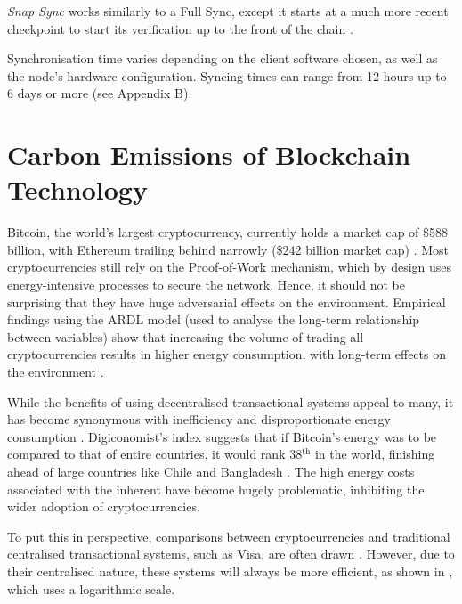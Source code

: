 \textit{Snap Sync} works similarly to a Full Sync, except it starts at a much more recent checkpoint to start its verification up to the front of the chain \cite{2022DeveloperGo-ethereum}.

Synchronisation time varies depending on the client software chosen, as well as the node's hardware configuration. Syncing times can range from 12 hours up to 6 days or more (see Appendix B).



\section{Carbon Emissions of Blockchain Technology }

Bitcoin, the world's largest cryptocurrency, currently holds a market cap of \$588 billion, with Ethereum trailing behind narrowly (\$242 billion market cap) \cite{BitcoinCoinMarketCap}. Most cryptocurrencies still rely on the Proof-of-Work mechanism, which by design uses energy-intensive processes to secure the network. Hence, it should not be surprising that they have huge adversarial effects on the environment. Empirical findings using the ARDL model (used to analyse the long-term relationship between variables) show that increasing the volume of trading all cryptocurrencies results in higher energy consumption, with long-term effects on the environment \cite{Schinckus2020Crypto-currenciesConsumption}. 

While the benefits of using decentralised transactional systems appeal to many, it has become synonymous with inefficiency and disproportionate energy consumption \cite{DeVriesBitcoinsProblem}. Digiconomist's index suggests that if Bitcoin's energy was to be compared to that of entire countries, it would rank 38$\mathrm{^{th}}$ in the world, finishing ahead of large countries like Chile and Bangladesh \cite{BitcoinDigiconomist}. The high energy costs associated with the inherent have become hugely problematic, inhibiting the wider adoption of cryptocurrencies. 

To put this in perspective, comparisons between cryptocurrencies and traditional centralised transactional systems, such as Visa, are often drawn \cite{Kohli2023AnSolutions}. However, due to their centralised nature, these systems will always be more efficient, as shown in , which uses a logarithmic scale.

